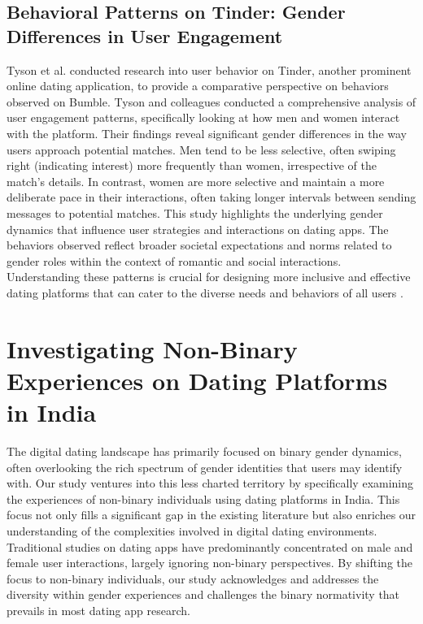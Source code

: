 \subsection{Behavioral Patterns on Tinder: Gender Differences in User Engagement}
Tyson et al. conducted research into user behavior on Tinder, another prominent online dating application, to provide a comparative perspective on behaviors observed on Bumble. Tyson and colleagues conducted a comprehensive analysis of user engagement patterns, specifically looking at how men and women interact with the platform. Their findings reveal significant gender differences in the way users approach potential matches. Men tend to be less selective, often swiping right (indicating interest) more frequently than women, irrespective of the match's details. In contrast, women are more selective and maintain a more deliberate pace in their interactions, often taking longer intervals between sending messages to potential matches. This study highlights the underlying gender dynamics that influence user strategies and interactions on dating apps. The behaviors observed reflect broader societal expectations and norms related to gender roles within the context of romantic and social interactions. Understanding these patterns is crucial for designing more inclusive and effective dating platforms that can cater to the diverse needs and behaviors of all users \cite{Tyson_Perta_Haddadi_Seto_2016}.

\section{Investigating Non-Binary Experiences on Dating Platforms in India}
The digital dating landscape has primarily focused on binary gender dynamics, often overlooking the rich spectrum of gender identities that users may identify with. Our study ventures into this less charted territory by specifically examining the experiences of non-binary individuals using dating platforms in India. This focus not only fills a significant gap in the existing literature but also enriches our understanding of the complexities involved in digital dating environments. Traditional studies on dating apps have predominantly concentrated on male and female user interactions, largely ignoring non-binary perspectives. By shifting the focus to non-binary individuals, our study acknowledges and addresses the diversity within gender experiences and challenges the binary normativity that prevails in most dating app research. 

